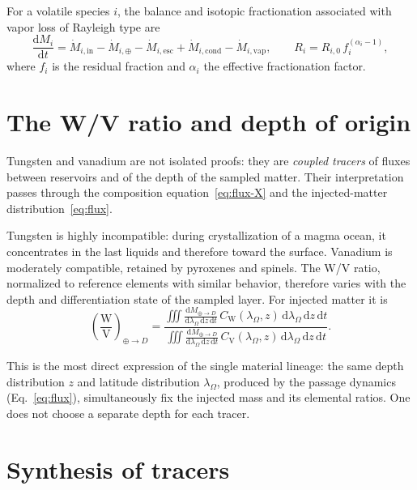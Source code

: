 \documentclass[11pt,a4paper,openany]{report}
\newcommand{\dd}{\mathrm{d}}
\begin{document}
For a volatile species $i$, the balance and isotopic fractionation associated with vapor loss of
Rayleigh type are
\begin{equation}
\frac{\dd M_i}{\dd t}=\dot M_{i,\mathrm{in}}-\dot M_{i,\oplus}-\dot M_{i,\mathrm{esc}}
+\dot M_{i,\mathrm{cond}}-\dot M_{i,\mathrm{vap}},
\qquad
R_i=R_{i,0}\,f_i^{(\alpha_i-1)},
\label{eq:volatils}
\end{equation}
where $f_i$ is the residual fraction and $\alpha_i$ the effective fractionation factor.

\section{The W/V ratio and depth of origin}

Tungsten and vanadium are not isolated proofs: they are \emph{coupled tracers} of fluxes between
reservoirs and of the depth of the sampled matter. Their interpretation passes through the
composition equation~\eqref{eq:flux-X} and the injected-matter distribution~\eqref{eq:flux}.

Tungsten is highly incompatible: during crystallization of a magma ocean, it concentrates in the
last liquids and therefore toward the surface. Vanadium is moderately compatible, retained by
pyroxenes and spinels. The W/V ratio, normalized to reference elements with similar behavior,
therefore varies with the depth and differentiation state of the sampled layer. For injected matter
it is
\begin{equation}
\left(\frac{\mathrm{W}}{\mathrm{V}}\right)_{\oplus\to D}=
\frac{\displaystyle\iiint\frac{\dd M_{\oplus\to D}}{\dd\lambda_\Omega\,\dd z\,\dd t}\,
C_{\mathrm{W}}(\lambda_\Omega,z)\,\dd\lambda_\Omega\,\dd z\,\dd t}
{\displaystyle\iiint\frac{\dd M_{\oplus\to D}}{\dd\lambda_\Omega\,\dd z\,\dd t}\,
C_{\mathrm{V}}(\lambda_\Omega,z)\,\dd\lambda_\Omega\,\dd z\,\dd t}.
\label{eq:WV}
\end{equation}

\begin{ideephys}
This is the most direct expression of the single material lineage: the same depth distribution $z$
and latitude distribution $\lambda_\Omega$, produced by the passage dynamics (Eq.~\eqref{eq:flux}),
simultaneously fix the injected mass and its elemental ratios. One does not choose a separate depth
for each tracer.
\end{ideephys}

\section{Synthesis of tracers}
\end{document}
